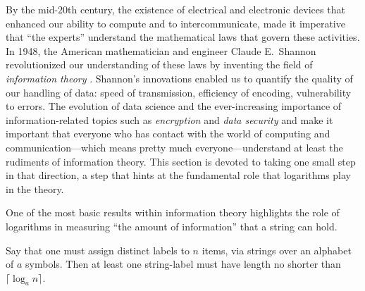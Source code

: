 By the mid-$20$th century, the existence of electrical and electronic
devices that enhanced our ability to compute and to intercommunicate,
made it imperative that ``the experts'' understand the mathematical
laws that govern these activities.  In 1948, the American
mathematician and engineer Claude E.~Shannon
revolutionized our understanding of these laws by inventing the field
of {\it information theory} 
\cite{Shannon48}.  Shannon's innovations enabled us to quantify the
quality of our handling of data: speed of transmission, efficiency of
encoding, vulnerability to errors.  The evolution of data science
 and the ever-increasing importance of
information-related topics such as {\it encryption} and {\it data
  security}  and  make it
important that everyone who has contact with the world of computing
and communication---which means pretty much everyone---understand at
least the rudiments of information theory.  This section is devoted to
taking one small step in that direction, a step that hints at the
fundamental role that logarithms play in the theory. 

One of the most basic results within information theory highlights the
role of logarithms in measuring ``the amount of information'' that a
string can hold.

\begin{prop}
\label{thm:bound-stringnames-lgth-k}
Say that one must assign distinct labels to $n$ items, via strings
over an alphabet of $a$ symbols.  Then at least one string-label must
have length no shorter than $\lceil \log_a n \rceil$.
\end{prop}

